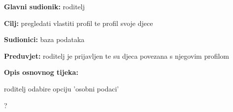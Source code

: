                     
                    \noindent {}
					\begin{packed_item}
	
						\item \textbf{Glavni sudionik: }roditelj
						\item  \textbf{Cilj:} pregledati vlastiti profil te profil svoje djece
						\item  \textbf{Sudionici:} baza podataka
						\item  \textbf{Preduvjet:} roditelj je prijavljen te su djeca povezana s njegovim profilom
						\item  \textbf{Opis osnovnog tijeka:}
						
						\item[] \begin{packed_enum}
	
							\item roditelj odabire opciju 'osobni podaci'
							\item ?
							
						\end{packed_enum}
						
					\end{packed_item}


